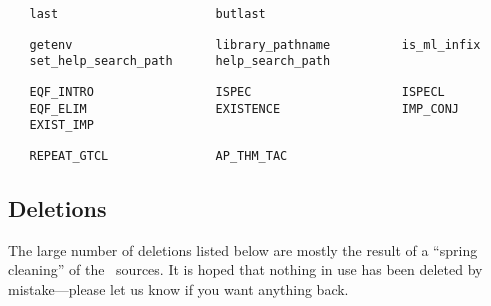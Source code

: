 \begin{hol}\begin{verbatim}
   last                      butlast
\end{verbatim}\end{hol}
\begin{hol}\begin{verbatim}
   getenv                    library_pathname          is_ml_infix
   set_help_search_path      help_search_path
\end{verbatim}\end{hol}
\begin{hol}\begin{verbatim}
   EQF_INTRO                 ISPEC                     ISPECL
   EQF_ELIM                  EXISTENCE                 IMP_CONJ
   EXIST_IMP
\end{verbatim}\end{hol}
\begin{hol}\begin{verbatim}
   REPEAT_GTCL               AP_THM_TAC
\end{verbatim}\end{hol}


\subsection{Deletions}

The large number of deletions listed below are mostly the result of a ``spring
cleaning'' of the \HOL\ sources. It is hoped that nothing in use has been
deleted by mistake---please let us know if you want anything back.

